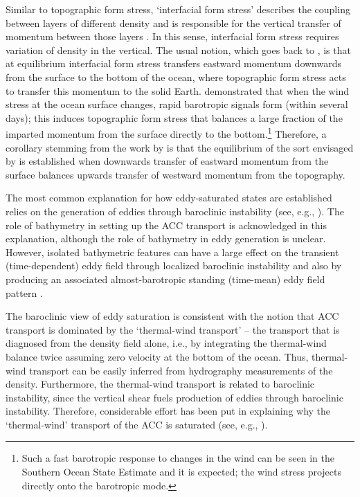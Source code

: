 \documentclass{agujournal2019}
\begin{document}
Similar to topographic form stress, `interfacial form stress' describes the coupling between layers of different density and is responsible for the vertical transfer of momentum between those layers \cite{Johnson-Bryden-1989,Olbers-etal-2004,Ward-Hogg-2011}. In this sense, interfacial form stress requires variation of density in the vertical. The usual notion, which goes back to , is that at equilibrium interfacial form stress transfers eastward momentum downwards from the surface to the bottom of the ocean, where topographic form stress acts to transfer this momentum to the solid Earth.  demonstrated that when the wind stress at the ocean surface changes, rapid barotropic signals form (within several days); this induces topographic form stress that balances a large fraction of the imparted momentum from the surface directly to the bottom.\footnote{Such a fast barotropic response to changes in the wind can be seen in the Southern Ocean State Estimate \cite{Masich-etal-2015} and it is expected; the wind stress projects directly onto the barotropic mode.} {\color{black}Therefore, a corollary stemming from the work by  is that the} equilibrium of the sort envisaged by  is established when downwards transfer of eastward momentum from the surface balances upwards transfer of westward momentum from the topography.


The most common explanation for how eddy-saturated states are established relies on the generation of eddies through baroclinic instability (see, e.g., ). The role of bathymetry in setting up the ACC transport is acknowledged in this explanation, although the role of bathymetry in eddy generation is unclear. However, isolated bathymetric features can have a large effect on the transient (time-dependent) eddy field through localized baroclinic instability and also {\color{black}by producing} an associated almost-barotropic standing (time-mean) eddy field pattern \cite{Abernathey-Cessi-2014}. 


The baroclinic view of eddy saturation is consistent with the notion that ACC transport is dominated by the `thermal-wind transport' -- the transport that is diagnosed from the density field alone{\color{black}, i.e., by integrating the thermal-wind balance twice} assuming zero velocity at the bottom of the ocean. Thus, thermal-wind transport can be easily inferred from hydrography measurements of the density. Furthermore, the thermal-wind transport is related to baroclinic instability, since the vertical shear  fuels production of eddies through baroclinic instability. Therefore, considerable effort has been put in explaining why the `thermal-wind' transport of the ACC is saturated (see, e.g., ).
\end{document}
